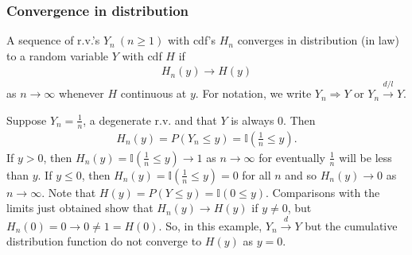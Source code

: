 \subsubsection{Convergence in distribution}
\begin{definition}
    A sequence of r.v.'s $Y_n~(n \geq 1)$ with cdf's $H_n$ converges
    in distribution (in law) to a random variable $Y$ with cdf $H$ if
    \begin{gather}
        H_n(y)\to H(y)
    \end{gather}
    as $n\to\infty$ whenever $H$ continuous at $y$. 
    For notation, we write $Y_n\Rightarrow Y$ or $Y_n\overset{d/l}{\longrightarrow}Y$.
\end{definition}

\begin{example}
    Suppose $Y_n=\frac{1}{n}$, a degenerate r.v. and that $Y$ is always 0.
    Then 
    \begin{gather}
        H_n(y)=P(Y_n\leq y)=\mathbb{I}(\frac{1}{n}\leq y).
    \end{gather}
    If $y>0$, then $H_n(y)=\mathbb{I}(\frac{1}{n}\leq y)\to 1$ as $n\to\infty$
    for eventually $\frac{1}{n}$ will be less than $y$.
    If $y\leq 0$, then $H_n(y)=\mathbb{I}(\frac{1}{n}\leq y)=0$ for all $n$ and 
    so $H_n(y)\to 0$ as $n\to\infty$.
    \newline
    Note that $H(y)=P(Y\leq y)=\mathbb{I}(0\leq y)$. Comparisons with
    the limits just obtained show that $H_n(y)\to H(y)$ if $y \neq 0$, 
    but $H_n(0) = 0 \to 0 \neq 1 = H(0)$. 
    So, in this example, $Y_n\overset{d}{\longrightarrow}Y$
    but the cumulative distribution function do not converge to $H(y)$ as $y=0$.
\end{example}

\newpage